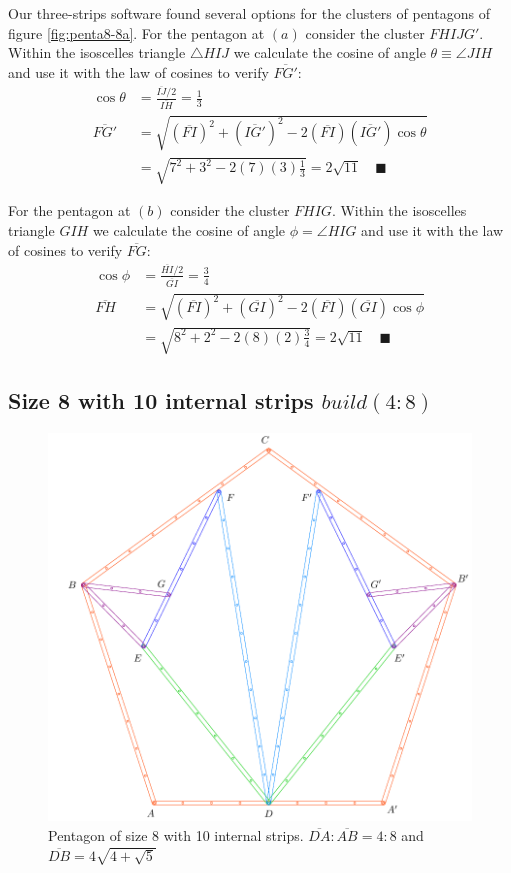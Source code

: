\documentclass[11pt]{article}
\begin{document}
Our three-strips software found several options for the clusters of pentagons of figure \ref{fig:penta8-8a}. For the pentagon at $(a)$ consider the cluster $FHIJG'$. Within the isoscelles triangle $\triangle{HIJ}$ we calculate the cosine of angle $\theta \equiv \angle{JIH}$ and use it with the law of cosines to verify $\overline{FG'}$:
\begin{align}
\cos\theta &= \frac{\overline{IJ}/2}{\overline{IH}} = \frac{1}3 \nonumber\\
\overline{FG'} &= \sqrt{(\overline{FI})^2 + (\overline{IG'})^2 
 - 2(\overline{FI})(\overline{IG'})\cos\theta} \nonumber\\
 &= \sqrt{7^2 + 3^2 - 2(7)(3)\frac{1}3} = 2\sqrt{11} \quad\blacksquare
\end{align}

For the pentagon at $(b)$ consider the cluster $FHIG$. Within the isoscelles triangle $GIH$ we calculate the cosine of angle $\phi = \angle{HIG}$ and use it with the law of cosines to verify $\overline{FG}$:
\begin{align}
\cos\phi &= \frac{\overline{HI}/2}{\overline{GI}} = \frac{3}4 \nonumber\\
\overline{FH} &= \sqrt{(\overline{FI})^2 + (\overline{GI})^2
 - 2(\overline{FI})(\overline{GI})\cos\phi} \nonumber\\
 &= \sqrt{8^2 + 2^2 - 2(8)(2)\frac{3}4} = 2\sqrt{11} \quad\blacksquare
\end{align}

\subsection{Size 8 with 10 internal strips $build(4:8)$}

\begin{figure}[H]
\centering
\includegraphics[scale=1]{8/penta8-10a}
\caption{Pentagon of size 8 with 10 internal strips. $\overline{DA}:\overline{AB} = 4:8$ and $\overline{DB} = 4\sqrt{4 + \sqrt5}$}
\label{fig:penta8-10a}
\end{figure}
\end{document}
